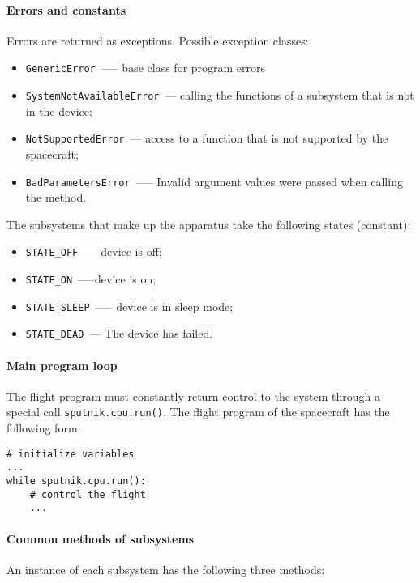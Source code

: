 \documentclass[12pt,a4paper]{article}
\begin{document}
\paragraph{Errors and constants}

Errors are returned as exceptions. Possible exception classes:

\begin{itemize}
\item \verb'GenericError'~--— base class for program errors
\item \verb'SystemNotAvailableError'~--- calling the functions of a subsystem that is not in the device;
\item \verb'NotSupportedError'~--- access to a function that is not supported by the spacecraft;
\item \verb'BadParametersError'~--— Invalid argument values were passed when calling the method.
\end{itemize}

The subsystems that make up the apparatus take the following states (constant):

\begin{itemize}
\item \verb'STATE_OFF'~--—device is off;
\item \verb'STATE_ON'~--—device is on;
\item \verb'STATE_SLEEP'~--— device is in sleep mode;
\item \verb'STATE_DEAD'~--- The device has failed.
\end{itemize}

\paragraph{Main program loop}

The flight program must constantly return control to the system through a special call \verb'sputnik.cpu.run()'. The flight program of the spacecraft has the following form:

\begin{verbatim}
# initialize variables
...
while sputnik.cpu.run():
    # control the flight
    ...
\end{verbatim}

\paragraph{Common methods of subsystems}

An instance of each subsystem has the following three methods:
\end{document}
